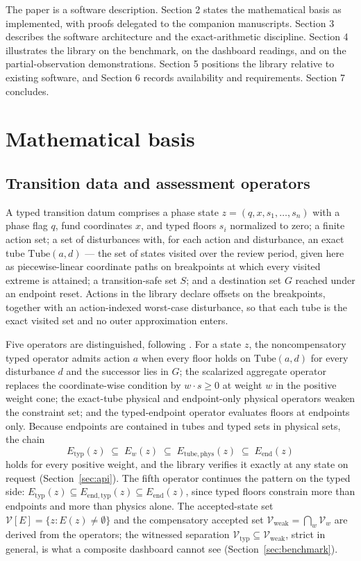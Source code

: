 \documentclass[3p,11pt]{elsarticle}
\begin{document}
The paper is a software description. Section 2 states the mathematical basis
as implemented, with proofs delegated to the companion manuscripts.
Section 3 describes the software architecture and the exact-arithmetic
discipline. Section 4 illustrates the library on the benchmark, on the
dashboard readings, and on the partial-observation demonstrations. Section 5
positions the library relative to existing software, and Section 6 records
availability and requirements. Section 7 concludes.

\section{Mathematical basis}\label{sec:math}

\subsection{Transition data and assessment operators}\label{sec:operators}

A typed transition datum comprises a phase state
$z = (q, x, s_1, \dots, s_n)$ with a phase flag $q$, fund coordinates $x$,
and typed floors $s_i$ normalized to zero; a finite action set; a set of disturbances with, for each action and
disturbance, an exact tube $\mathrm{Tube}(a, d)$ --- the set of states
visited over the review period, given here as piecewise-linear coordinate
paths on breakpoints at which every visited extreme is attained; a
transition-safe set $S$; and a destination set $G$ reached under an endpoint
reset. Actions in the library declare offsets on the breakpoints, together
with an action-indexed worst-case disturbance, so that each tube is the
exact visited set and no outer approximation enters.

Five operators are distinguished, following \citet{Abaee2026a}. For a state $z$,
the noncompensatory typed operator admits action $a$ when every floor holds
on $\mathrm{Tube}(a, d)$ for every disturbance $d$ and the successor lies in
$G$; the scalarized aggregate operator replaces the coordinate-wise
condition by $w \cdot s \geq 0$ at weight $w$ in the positive weight cone;
the exact-tube physical and endpoint-only physical operators weaken the
constraint set; and the typed-endpoint operator evaluates floors at
endpoints only. Because endpoints are contained in tubes and typed sets in
physical sets, the chain
\[
E_{\mathrm{typ}}(z) \;\subseteq\; E_w(z) \;\subseteq\;
E_{\mathrm{tube,phys}}(z) \;\subseteq\; E_{\mathrm{end}}(z)
\]
holds for every positive weight, and the library verifies it exactly at any
state on request (Section~\ref{sec:api}). The fifth operator continues the
pattern on the typed side: $E_{\mathrm{typ}}(z) \subseteq
E_{\mathrm{end,typ}}(z) \subseteq E_{\mathrm{end}}(z)$, since typed floors
constrain more than endpoints and more than physics alone. The accepted-state set
$\mathcal{V}[E] = \{ z : E(z) \neq \emptyset \}$ and the compensatory
accepted set $\mathcal{V}_{\mathrm{weak}} = \bigcap_w \mathcal{V}_w$ are
derived from the operators; the witnessed separation
$\mathcal{V}_{\mathrm{typ}} \subseteq \mathcal{V}_{\mathrm{weak}}$, strict in
general, is what a composite dashboard cannot see (Section~\ref{sec:benchmark}).
\end{document}
